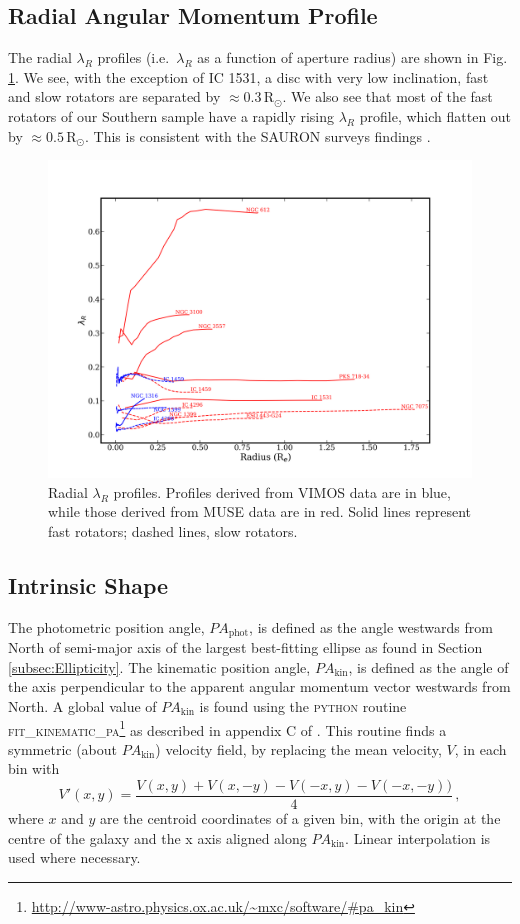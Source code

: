 	\subsection{Radial Angular Momentum Profile}
		\label{subsec:ResolvedLambda_R}
		The radial $\lambda_R$ profiles (i.e.\ $\lambda_R$ as a function of aperture radius) are shown in Fig.\,\ref{fig:lambdaR_profile}. We see, with the exception of IC 1531, a disc with very low inclination, fast and slow rotators are separated by $\approx 0.3\,\mathrm{R_\odot}$. We also see that most of the fast rotators of our Southern sample have a rapidly rising $\lambda_R$ profile, which flatten out by $\approx 0.5\,\mathrm{R_\odot}$. This is consistent with the SAURON surveys findings \citep[e.g.][Fig.\,2]{Emsellem2007}. 

		\begin{figure}
			\centering
			\includegraphics[width=.7\textwidth]{chapter4/lambda_R.png}
			\caption[$\lambda_{R}$ radial profiles]{Radial $\lambda_{R}$ profiles. Profiles derived from VIMOS data are in blue, while those derived from MUSE data are in red. Solid lines represent fast rotators; dashed lines, slow rotators.}
			\label{fig:lambdaR_profile}
		\end{figure}

		
		\subsection{Intrinsic Shape}
			\label{subsec:Misalignment}

			The photometric position angle, $PA_\text{phot}$, is defined as the angle westwards from North of semi-major axis of the largest best-fitting ellipse as found in Section \ref{subsec:Ellipticity}. The kinematic position angle, $PA_\text{kin}$, is defined as the angle of the axis perpendicular to the apparent angular momentum vector westwards from North. A global value of $PA_\text{kin}$ is found using the \textsc{python} routine \textsc{fit\_kinematic\_pa}\footnote{\url{http://www-astro.physics.ox.ac.uk/\~mxc/software/\#pa\_kin}} as described in appendix C of \citet{Krajnovic2006}. This routine finds a symmetric (about $PA_\text{kin}$) velocity field, by replacing the mean velocity, $V$, in each bin with
			\begin{equation}
				V'(x, y) = \frac{V(x,y) + V(x, -y) - V(-x,y) - V(-x,-y))}{4} \,,
			\end{equation}
			where $x$ and $y$ are the centroid coordinates of a given bin, with the origin at the centre of the galaxy and the x axis aligned along $PA_\text{kin}$. Linear interpolation is used where necessary.

